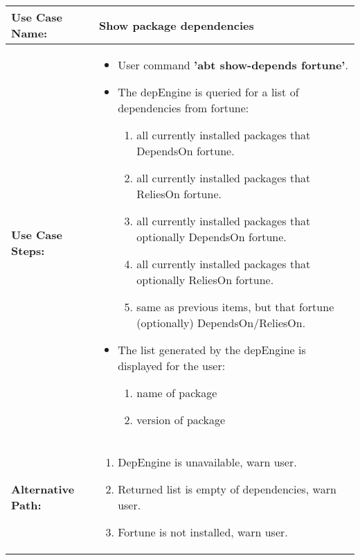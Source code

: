 \medskip

\begin{tabularx}{\linewidth}{|l|X|}
\hline
\textbf{Use Case Name:} & \textbf{Show package dependencies} \\
\hline
\textbf{Use Case Steps:} & 
\begin{minipage}{\linewidth} 
  \vspace{0.05em}
  \begin{itemize}
    \item User command \textbf{'abt show-depends fortune'}.
    \item The depEngine is queried for a list of dependencies from fortune:
    \begin{enumerate}
      \item all currently installed packages that DependsOn fortune.
      \item all currently installed packages that ReliesOn fortune.
      \item all currently installed packages that optionally DependsOn fortune.
      \item all currently installed packages that optionally ReliesOn fortune.
      \item same as previous items, but that fortune (optionally) DependsOn/ReliesOn.
    \end{enumerate}
    \item The list generated by the depEngine is displayed for the user:
    \begin{enumerate}
      \item name of package
      \item version of package
    \end{enumerate}
  \end{itemize}

  \vspace{0.05em}
\end{minipage}
\\
\hline 
\textbf{Alternative Path:} &
\begin{minipage}{\linewidth}
  \vspace{0.05em} 
  \begin{enumerate}
    \item DepEngine is unavailable, warn user.
    \item Returned list is empty of dependencies, warn user.
    \item Fortune is not installed, warn user.
  \end{enumerate}
  \vspace{0.05em} 
\end{minipage}
\\
\hline
\end{tabularx}